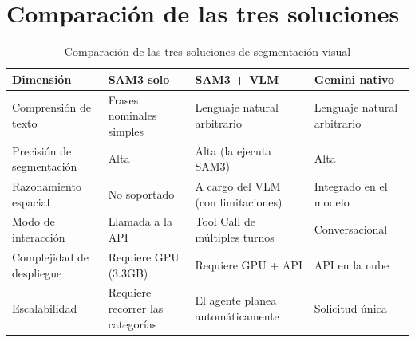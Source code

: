 \section{Comparación de las tres soluciones}

\begin{table}[H]
\centering
\begin{tabular}{p{3cm}p{3.5cm}p{3.5cm}p{3.5cm}}
\toprule
\textbf{Dimensión} & \textbf{SAM3 solo} & \textbf{SAM3 + VLM} & \textbf{Gemini nativo} \\
\midrule
Comprensión de texto & Frases nominales simples & Lenguaje natural arbitrario & Lenguaje natural arbitrario \\
Precisión de segmentación & Alta & Alta (la ejecuta SAM3) & Alta \\
Razonamiento espacial & No soportado & A cargo del VLM (con limitaciones) & Integrado en el modelo \\
Modo de interacción & Llamada a la API & Tool Call de múltiples turnos & Conversacional \\
Complejidad de despliegue & Requiere GPU (3.3GB) & Requiere GPU + API & API en la nube \\
Escalabilidad & Requiere recorrer las categorías & El agente planea automáticamente & Solicitud única \\
\bottomrule
\end{tabular}
\caption{Comparación de las tres soluciones de segmentación visual}
\end{table}


